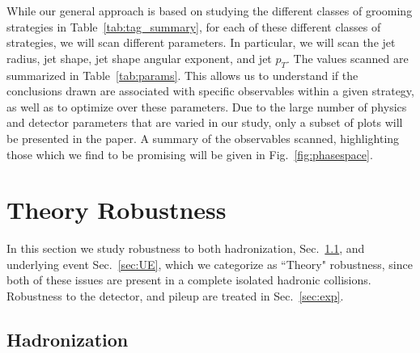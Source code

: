 \documentclass[11pt,letterpaper]{article}
\DeclareRobustCommand{\Sec}[1]{Sec.~\ref{#1}}
\DeclareRobustCommand{\Tab}[1]{Table~\ref{#1}}
\DeclareRobustCommand{\Fig}[1]{Fig.~\ref{#1}}
\begin{document}
While our general approach is based on studying the different classes of grooming strategies in \Tab{tab:tag_summary}, for each of these different classes of strategies, we will scan different parameters.
%
In particular, we will scan the jet radius, jet shape, jet shape angular exponent, and jet $p_T$.
%
The values scanned are summarized in \Tab{tab:params}.
%
This allows us to understand if the conclusions drawn are associated with specific observables within a given strategy, as well as to optimize over these parameters.
%
Due to the large number of physics and detector parameters that are varied in our study, only a subset of plots will be presented in the paper. A summary of the observables scanned, highlighting those which we find to be promising will be given in \Fig{fig:phasespace}.
%


























\section{Theory Robustness}\label{sec:np}


In this section we study robustness to both hadronization, \Sec{sec:hadr}, and underlying event \Sec{sec:UE}, which we categorize as ``Theory" robustness, since both of these issues are present in a complete isolated hadronic collisions. Robustness to the detector, and pileup are treated in \Sec{sec:exp}. 








\subsection{Hadronization}\label{sec:hadr}
\end{document}
